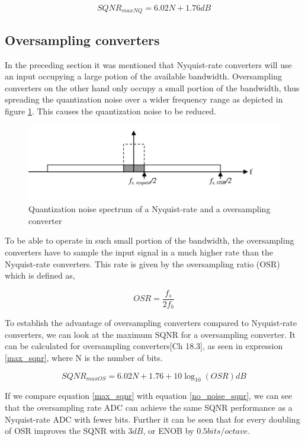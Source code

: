 \begin{equation}\label{no_noise_sqnr}
    SQNR_{maxNQ} = 6.02N + 1.76 dB
\end{equation}

\subsection{Oversampling converters}
In the preceding section it was mentioned that Nyquist-rate converters will use an input occupying a large potion of the available bandwidth. Oversampling converters on the other hand only occupy a small portion of the bandwidth, thus spreading the quantization noise over a wider frequency range as depicted in figure \ref{fig:oversample}. This causes the quantization noise to be reduced.  

\begin{figure}[h]
\centering
\includegraphics[scale=1]{images/oversample.png}
\caption{Quantization noise spectrum of a Nyquist-rate and a oversampling converter}
\label{fig:oversample}
\end{figure}

To be able to operate in such small portion of the bandwidth, the oversampling converters have to sample the input signal in a much higher rate than the Nyquist-rate converters. This rate is given by the oversampling ratio (OSR) which is defined as,

\begin{equation}
    OSR = \frac{f_s}{2f_b}
\end{equation}

To establish the advantage of oversampling converters compared to Nyquist-rate converters, we can look at the maximum SQNR for a oversampling converter. It can be calculated for oversampling converters\cite{Johns}[Ch 18.3], as seen in expression \ref{max_sqnr}, where N is the number of bits.


\begin{equation}\label{max_sqnr}
    SQNR_{maxOS} = 6.02N + 1.76 + 10\log_{10}(OSR) dB
\end{equation}

If we compare equation \ref{max_sqnr} with equation \ref{no_noise_sqnr}, we can see that the oversampling rate ADC can achieve the same SQNR performance as a Nyquist-rate ADC with fewer bits. Further it can be seen that for every doubling of OSR improves the SQNR with $3 dB$, or ENOB by $0.5bits/octave$. 

